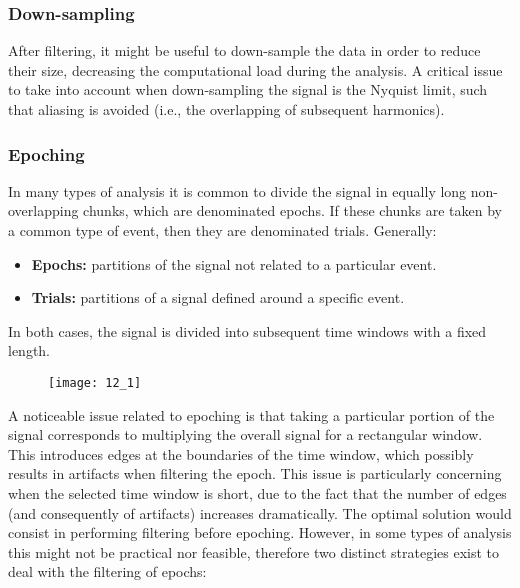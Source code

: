 \subsubsection{Down-sampling}
After filtering, it might be useful to down-sample the data in order to reduce their size, decreasing
the computational load during the analysis. A critical issue to
take into account when down-sampling the signal is the Nyquist limit, such that
aliasing is avoided (i.e., the overlapping of subsequent harmonics).
\subsubsection{Epoching}
In many types of analysis it is common to divide the signal in equally long
non-overlapping chunks, which are denominated epochs. If these chunks are taken
by a common type of event, then they are denominated trials. Generally:
\begin{itemize}
    \item \textbf{Epochs:} partitions of the signal not related to a particular event.
    \item \textbf{Trials:} partitions of a signal defined around a specific event.
\end{itemize}
In both cases, the signal is divided into subsequent time windows with a fixed
length.
\begin{figure}[H]
    \centering
    \texttt{[image: 12\_1]}
\end{figure}
A noticeable issue related to epoching is that taking a particular portion of
the signal corresponds to multiplying the overall signal for a rectangular window.
This introduces edges at the boundaries of the time window, which possibly results
in artifacts when filtering the epoch. This issue is particularly concerning when
the selected time window is short, due to the fact that the number of edges
(and consequently of artifacts) increases dramatically.
The optimal solution would consist in performing filtering before epoching. However,
in some types of analysis this might not be practical nor feasible, therefore two
distinct strategies exist to deal with the filtering of epochs:
